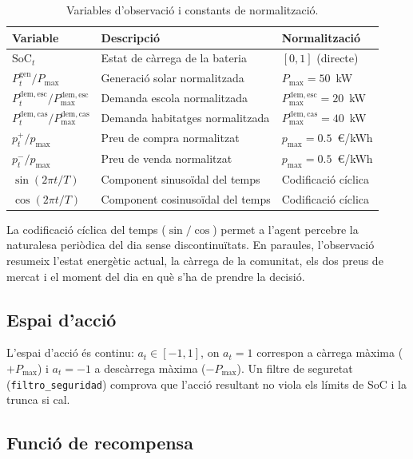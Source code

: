 \documentclass[a4paper,12pt,twoside]{ThesisStyle}
\begin{document}
\begin{table}[htb]
\centering
\begin{tabular}{@{}lll@{}}
\toprule
\textbf{Variable} & \textbf{Descripció} & \textbf{Normalització} \\
\midrule
$\mathrm{SoC}_t$ & Estat de càrrega de la bateria & $[0, 1]$ (directe) \\
$P_t^{\mathrm{gen}} / P_{\max}$ & Generació solar normalitzada & $P_{\max} = 50$~kW \\
$P_t^{\mathrm{dem,esc}} / P_{\max}^{\mathrm{dem,esc}}$ & Demanda escola normalitzada & $P_{\max}^{\mathrm{dem,esc}} = 20$~kW \\
$P_t^{\mathrm{dem,cas}} / P_{\max}^{\mathrm{dem,cas}}$ & Demanda habitatges normalitzada & $P_{\max}^{\mathrm{dem,cas}} = 40$~kW \\
$p_t^{+} / p_{\max}$ & Preu de compra normalitzat & $p_{\max} = 0.5$~€/kWh \\
$p_t^{-} / p_{\max}$ & Preu de venda normalitzat & $p_{\max} = 0.5$~€/kWh \\
$\sin(2\pi t / T)$ & Component sinusoïdal del temps & Codificació cíclica \\
$\cos(2\pi t / T)$ & Component cosinusoïdal del temps & Codificació cíclica \\
\bottomrule
\end{tabular}
\caption{Variables d'observació i constants de normalització.}
\label{taula:observacions}
\end{table}

La codificació cíclica del temps ($\sin/\cos$) permet a l'agent percebre la naturalesa periòdica del dia sense discontinuïtats. En paraules, l'observació resumeix l'estat energètic actual, la càrrega de la comunitat, els dos preus de mercat i el moment del dia en què s'ha de prendre la decisió.

\subsection{Espai d'acció}

L'espai d'acció és continu: $a_t \in [-1, 1]$, on $a_t = 1$ correspon a càrrega màxima ($+P_{\max}$) i $a_t = -1$ a descàrrega màxima ($-P_{\max}$). Un filtre de seguretat (\texttt{filtro\_seguridad}) comprova que l'acció resultant no viola els límits de SoC i la trunca si cal.

\subsection{Funció de recompensa}
\end{document}
